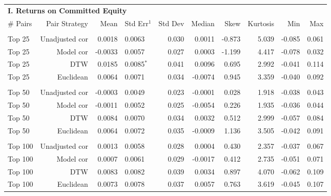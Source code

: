 \documentclass[12pt]{article}
\begin{document}
\begin{table}[hp]
    \fontsize{8pt}{8pt}\selectfont
    \centering
    \begin{tabular}{l r r l r r r r r r}
        \multicolumn{9}{l}{\textbf{I. Returns on Committed Equity}} \\
        \# Pairs & Pair Strategy & Mean & Std Err{$^{1}$} & Std Dev & Median & Skew & Kurtosis & Min & Max \\
        \hline
        \vspace{-1mm} \\
        Top 25    & Unadjusted cor &  0.0018 & 0.0063          & 0.030 &  0.0011 & -0.873 & 5.039 & -0.085 & 0.061 \\
        Top 25    & Model cor      & -0.0033 & 0.0057          & 0.027 &  0.0003 & -1.199 & 4.417 & -0.078 & 0.032 \\
        Top 25    & DTW            &  0.0185 & 0.0085{$^{*}$}  & 0.041 &  0.0096 &  0.695 & 2.992 & -0.041 & 0.114 \\
        Top 25    & Euclidean      &  0.0064 & 0.0071          & 0.034 & -0.0074 &  0.945 & 3.359 & -0.040 & 0.092 \\
        \vspace{-1mm} \\
        Top 50    & Unadjusted cor & -0.0003 & 0.0049          & 0.023 & -0.0001 &  0.028 & 1.918 & -0.038 & 0.043 \\
        Top 50    & Model cor      & -0.0011 & 0.0052          & 0.025 & -0.0054 &  0.226 & 1.935 & -0.036 & 0.044 \\
        Top 50    & DTW            &  0.0084 & 0.0070          & 0.034 &  0.0032 &  0.512 & 2.999 & -0.057 & 0.084 \\
        Top 50    & Euclidean      &  0.0064 & 0.0072          & 0.035 & -0.0009 &  1.136 & 3.505 & -0.042 & 0.091 \\
        \vspace{-1mm} \\
        Top 100   & Unadjusted cor &  0.0013 & 0.0058          & 0.028 &  0.0004 &  0.430 & 2.357 & -0.037 & 0.067 \\
        Top 100   & Model cor      &  0.0007 & 0.0061          & 0.029 & -0.0017 &  0.412 & 2.735 & -0.051 & 0.071 \\
        Top 100   & DTW            &  0.0083 & 0.0082          & 0.039 &  0.0034 &  0.897 & 4.070 & -0.062 & 0.109 \\
        Top 100   & Euclidean      &  0.0073 & 0.0078          & 0.037 &  0.0057 &  0.763 & 3.619 & -0.045 & 0.107 \\

\end{tabular}
\end{table}
\end{document}
